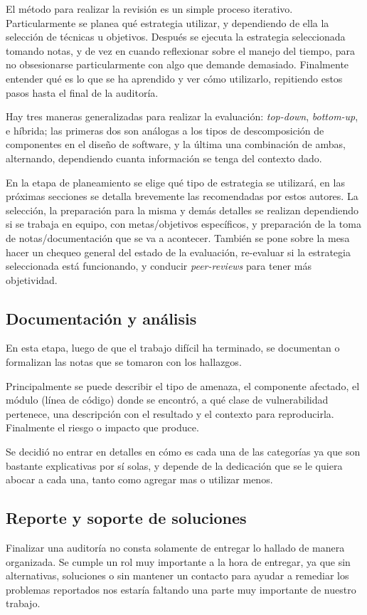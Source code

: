 El método para realizar la revisión es un simple proceso iterativo. Particularmente se planea qué estrategia utilizar, y dependiendo de ella la selección de técnicas u objetivos. Después se ejecuta la estrategia seleccionada tomando notas, y de vez en cuando reflexionar sobre el manejo del tiempo, para no obsesionarse particularmente con algo que demande demasiado. Finalmente entender qué es lo que se ha aprendido y ver cómo utilizarlo, repitiendo estos pasos hasta el final de la auditoría.

Hay tres maneras generalizadas para realizar la evaluación: \textit{top-down}, \textit{bottom-up}, e híbrida; las primeras dos son análogas a los tipos de descomposición de componentes en el diseño de software, y la última una combinación de ambas, alternando, dependiendo cuanta información se tenga del contexto dado.

En la etapa de planeamiento se elige qué tipo de estrategia se utilizará, en las próximas secciones se detalla brevemente las recomendadas por estos autores. La selección, la preparación para la misma y demás detalles se realizan dependiendo si se trabaja en equipo, con metas/objetivos específicos, y preparación de la toma de notas/documentación que se va a acontecer. También se pone sobre la mesa hacer un chequeo general del estado de la evaluación, re-evaluar si la estrategia seleccionada está funcionando, y conducir \textit{peer-reviews} para tener más objetividad.

\subsection{Documentación y análisis}
En esta etapa, luego de que el trabajo difícil ha terminado, se documentan o formalizan las notas que se tomaron con los hallazgos. 

Principalmente se puede describir el tipo de amenaza, el componente afectado, el módulo (línea de código) donde se encontró, a qué clase de vulnerabilidad pertenece, una descripción con el resultado y el contexto para reproducirla. Finalmente el riesgo o impacto que produce.

Se decidió no entrar en detalles en cómo es cada una de las categorías ya que son bastante explicativas por sí solas, y depende de la dedicación que se le quiera abocar a cada una, tanto como agregar mas o utilizar menos.

\subsection{Reporte y soporte de soluciones}
Finalizar una auditoría no consta solamente de entregar lo hallado de manera organizada. Se cumple un rol muy importante a la hora de entregar, ya que sin alternativas, soluciones o sin mantener un contacto para ayudar a remediar los problemas reportados nos estaría faltando una parte muy importante de nuestro trabajo.

